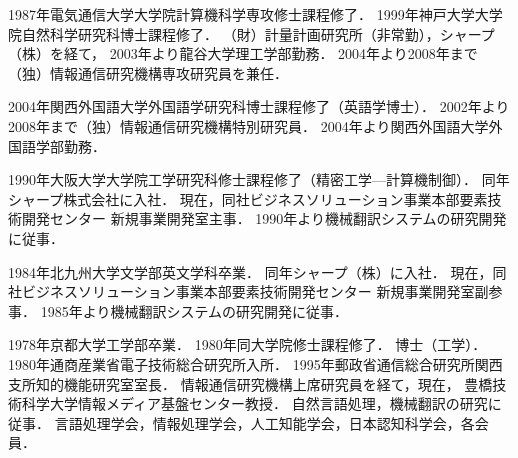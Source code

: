\documentclass[japanese]{jnlp_1.4}
\begin{document}
\begin{biography}

{1987年電気通信大学大学院計算機科学専攻修士課程修了． 
1999年神戸大学大学院自然科学研究科博士課程修了．
（財）計量計画研究所（非常勤），シャープ（株）を経て，
2003年より龍谷大学理工学部勤務．
2004年より2008年まで（独）情報通信研究機構専攻研究員を兼任．}

{2004年関西外国語大学外国語学研究科博士課程修了（英語学博士）．
2002年より2008年まで（独）情報通信研究機構特別研究員．
2004年より関西外国語大学外国語学部勤務．}

{1990年大阪大学大学院工学研究科修士課程修了（精密工学—計算機制御）．
同年シャープ株式会社に入社．
現在，同社ビジネスソリューション事業本部要素技術開発センター
新規事業開発室主事．
1990年より機械翻訳システムの研究開発に従事．}

{1984年北九州大学文学部英文学科卒業．
同年シャープ（株）に入社．
現在，同社ビジネスソリューション事業本部要素技術開発センター
新規事業開発室副参事．
1985年より機械翻訳システムの研究開発に従事．}

{1978年京都大学工学部卒業．
1980年同大学院修士課程修了．
博士（工学）．
1980年通商産業省電子技術総合研究所入所．
1995年郵政省通信総合研究所関西支所知的機能研究室室長．
情報通信研究機構上席研究員を経て，現在，
豊橋技術科学大学情報メディア基盤センター教授．
自然言語処理，機械翻訳の研究に従事．
言語処理学会，情報処理学会，人工知能学会，日本認知科学会，各会員．}

\end{biography}


\biodate
\end{document}
